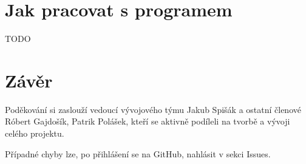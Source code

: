\documentclass[a4paper, 11pt]{article}
\begin{document}
\section{Jak pracovat s programem}\label{prace}
TODO

\section{Závěr}\label{zaver}
Poděkování si zaslouží vedoucí vývojového týmu Jakub Spišák a ostatní členové Róbert Gajdošík, Patrik Polášek, kteří se aktivně podíleli na tvorbě a vývoji celého projektu.\par
Případné chyby lze, po přihlášení se na GitHub, nahlásit v sekci Issues.
\end{document}
